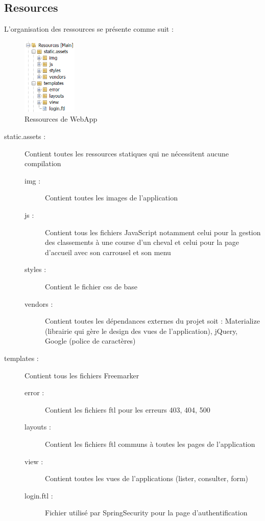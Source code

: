 		\subsection{Resources}

			L'organisation des ressources se présente comme suit :

			\begin{figure}[H]
				\centering\includegraphics[width=0.23\textwidth, keepaspectratio]{res/ressources.png}
				\caption{Ressources de WebApp}
			\end{figure}

			\begin{description}
				\item[static.assets :]{Contient toutes les ressources statiques qui ne nécessitent aucune compilation}
				\begin{description}
					\item[img :]{Contient toutes les images de l'application}
					\item[js :]{Contient tous les fichiers JavaScript notamment celui pour la gestion des classements à une course d'un cheval et celui pour la page d'accueil avec son carrousel et son menu}
					\item[styles :]{Contient le fichier css de base}
					\item[vendors :]{Contient toutes les dépendances externes du projet soit : Materialize (librairie qui gère le design des vues de l'application), jQuery, Google (police de caractères)}
				\end{description}

				\item[templates :]{Contient tous les fichiers Freemarker}
				\begin{description}
					\item[error :]{Contient les fichiers ftl pour les erreurs 403, 404, 500}
					\item[layouts :]{Contient les fichiers ftl communs à toutes les pages de l'application}
					\item[view :]{Contient toutes les vues de l'applications (lister, consulter, form)}
					\item[login.ftl :]{Fichier utilisé par SpringSecurity pour la page d'authentification}
				\end{description}
			\end{description}

